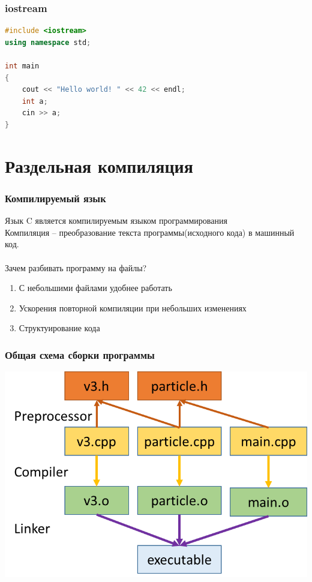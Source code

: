 \documentclass[10pt]{beamer}
\begin{document}
\begin{frame}[fragile]
\frametitle{iostream} 
\begin{lstlisting}[language=C++,basicstyle=\ttfamily,keywordstyle=\color{blue}]
#include <iostream>
using namespace std;

int main 
{
    cout << "Hello world! " << 42 << endl;    
    int a;
    cin >> a;
}
\end{lstlisting}
\end{frame}


\section{Раздельная компиляция}

\begin{frame}[fragile]
\frametitle{Компилируемый язык} 
Язык C является компилируемым языком программирования \\
Компиляция -- преобразование текста программы(исходного кода) в машинный код. \\
\quad\\
Зачем разбивать программу на файлы?
\begin{enumerate}
\item С небольшими файлами удобнее работать
\item Ускорения повторной компиляции при небольших изменениях
\item Структуирование кода
\end{enumerate}
\end{frame}

\begin{frame}[fragile]
\frametitle{Общая схема сборки программы} 
\begin{center}
\includegraphics[width=0.95\linewidth]{images/separate_compilation_linking.png}
\end{center}
\end{frame}
\end{document}
